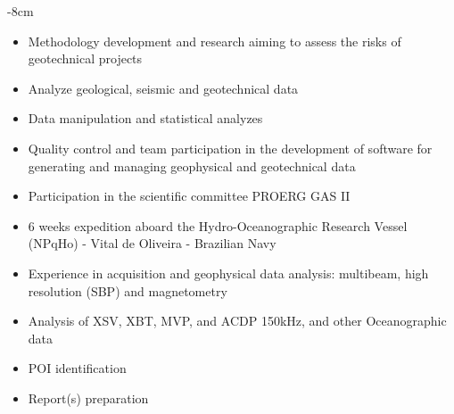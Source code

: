 \documentclass[10pt,a4paper]{altacv}
\begin{document}

\begin{adjustwidth}{}{-8cm}
\makecvheader
\end{adjustwidth}


\begin{itemize}
\item Methodology development and research aiming to assess the risks of geotechnical projects
\item Analyze geological, seismic and geotechnical data
\item Data manipulation and statistical analyzes
\item Quality control and team participation in the development of software for generating and managing geophysical 
and geotechnical data  
\end{itemize}
\divider
{}
\begin{itemize}
\item Participation in the scientific committee PROERG GAS II  
\item 6 weeks expedition aboard the Hydro-Oceanographic Research Vessel (NPqHo) - Vital de Oliveira - Brazilian Navy
\item Experience in acquisition and geophysical data analysis: multibeam, high resolution (SBP) and magnetometry
\item Analysis of XSV, XBT, MVP, and ACDP 150kHz, and other Oceanographic data
\item POI identification
\item Report(s) preparation
\end{itemize}
\end{document}
